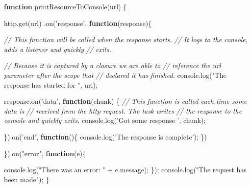 \documentclass[12pt, ]{article}
\newenvironment{Shaded}{}{}
\newcommand{\KeywordTok}[1]{\textcolor[rgb]{0.00,0.44,0.13}{\textbf{{#1}}}}
\newcommand{\StringTok}[1]{\textcolor[rgb]{0.25,0.44,0.63}{{#1}}}
\newcommand{\CommentTok}[1]{\textcolor[rgb]{0.38,0.63,0.69}{\textit{{#1}}}}
\newcommand{\OtherTok}[1]{\textcolor[rgb]{0.00,0.44,0.13}{{#1}}}
\newcommand{\FunctionTok}[1]{\textcolor[rgb]{0.02,0.16,0.49}{{#1}}}
\newcommand{\NormalTok}[1]{{#1}}
\begin{document}
\begin{Shaded}
\begin{Highlighting}[]
\KeywordTok{function} \FunctionTok{printResourceToConsole}\NormalTok{(url) \{}

   \OtherTok{http}\NormalTok{.}\FunctionTok{get}\NormalTok{(url)}
      \NormalTok{.}\FunctionTok{on}\NormalTok{(}\StringTok{'response'}\NormalTok{, }\KeywordTok{function}\NormalTok{(response)\{}
      
         \CommentTok{// This function will be called when the response starts.}
         \CommentTok{// It logs to the console, adds a listener and quickly }
         \CommentTok{// exits.}
         
         \CommentTok{// Because it is captured by a closure we are able to }
         \CommentTok{// reference the url parameter after the scope that }
         \CommentTok{// declared it has finished.            }
         \OtherTok{console}\NormalTok{.}\FunctionTok{log}\NormalTok{(}\StringTok{"The response has started for "}\NormalTok{, url);}
      
         \OtherTok{response}\NormalTok{.}\FunctionTok{on}\NormalTok{(}\StringTok{'data'}\NormalTok{, }\KeywordTok{function}\NormalTok{(chunk) \{      }
            \CommentTok{// This function is called each time some data is}
            \CommentTok{// received from the http request. The task writes}
            \CommentTok{// the response to the console and quickly exits.}
            \OtherTok{console}\NormalTok{.}\FunctionTok{log}\NormalTok{(}\StringTok{'Got some response '}\NormalTok{, chunk);}
                   
         \NormalTok{\}).}\FunctionTok{on}\NormalTok{(}\StringTok{'end'}\NormalTok{, }\KeywordTok{function}\NormalTok{()\{}
            \OtherTok{console}\NormalTok{.}\FunctionTok{log}\NormalTok{(}\StringTok{'The response is complete'}\NormalTok{);}
         \NormalTok{\})}
         
      \NormalTok{\}).}\FunctionTok{on}\NormalTok{(}\StringTok{"error"}\NormalTok{, }\KeywordTok{function}\NormalTok{(e)\{}
         
         \OtherTok{console}\NormalTok{.}\FunctionTok{log}\NormalTok{(}\StringTok{"There was an error: "} \NormalTok{+ }\OtherTok{e}\NormalTok{.}\FunctionTok{message}\NormalTok{);}
      \NormalTok{\});      }
   \OtherTok{console}\NormalTok{.}\FunctionTok{log}\NormalTok{(}\StringTok{"The request has been made"}\NormalTok{);}
\NormalTok{\}   }
\end{Highlighting}
\end{Shaded}
\end{document}
